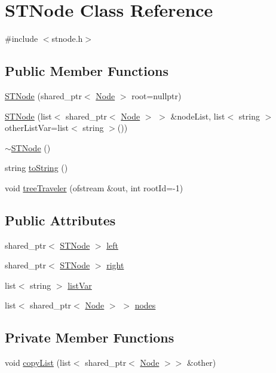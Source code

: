 \hypertarget{class_s_t_node}{}\section{S\+T\+Node Class Reference}
\label{class_s_t_node}


{\ttfamily \#include $<$stnode.\+h$>$}

\subsection*{Public Member Functions}
\begin{DoxyCompactItemize}
\item 
\hyperlink{class_s_t_node_adcdfca666c892461693ac42920fbc0df}{S\+T\+Node} (shared\+\_\+ptr$<$ \hyperlink{class_node}{Node} $>$ root=nullptr)
\item 
\hyperlink{class_s_t_node_abc48151a02b70b445ef9c4e5066c1fe8}{S\+T\+Node} (list$<$ shared\+\_\+ptr$<$ \hyperlink{class_node}{Node} $>$ $>$ \&node\+List, list$<$ string $>$ other\+List\+Var=list$<$ string $>$())
\item 
\hyperlink{class_s_t_node_a535f7a100908f02b166cb54124dfbea3}{$\sim$\+S\+T\+Node} ()
\item 
string \hyperlink{class_s_t_node_acb631ef4448c8faf7c88c9c61568ca0a}{to\+String} ()
\item 
void \hyperlink{class_s_t_node_a1850972d568af9275b19b828522df434}{tree\+Traveler} (ofstream \&out, int root\+Id=-\/1)
\end{DoxyCompactItemize}
\subsection*{Public Attributes}
\begin{DoxyCompactItemize}
\item 
shared\+\_\+ptr$<$ \hyperlink{class_s_t_node}{S\+T\+Node} $>$ \hyperlink{class_s_t_node_a19ba8bab4660bdeee0e897687b451a8b}{left}
\item 
shared\+\_\+ptr$<$ \hyperlink{class_s_t_node}{S\+T\+Node} $>$ \hyperlink{class_s_t_node_a66d06118063fb739058f91c75b725e27}{right}
\item 
list$<$ string $>$ \hyperlink{class_s_t_node_ac6db937d531b08614534af47cee8dace}{list\+Var}
\item 
list$<$ shared\+\_\+ptr$<$ \hyperlink{class_node}{Node} $>$ $>$ \hyperlink{class_s_t_node_a370cb3b8a6bcd2e488a27d47be4e0920}{nodes}
\end{DoxyCompactItemize}
\subsection*{Private Member Functions}
\begin{DoxyCompactItemize}
\item 
void \hyperlink{class_s_t_node_a55d1f2a5254f3ef8ec9f0f5023177798}{copy\+List} (list$<$ shared\+\_\+ptr$<$ \hyperlink{class_node}{Node} $>$$>$ \&other)
\end{DoxyCompactItemize}

